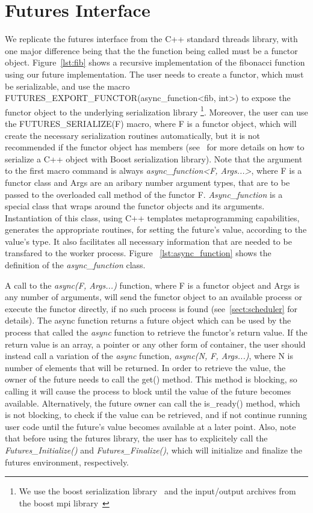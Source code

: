\section{Futures Interface}
\label{sect:futures-interface}
We replicate the futures interface from the C++ standard threads library, with one major difference being that 
the the function being called must be a functor object.  Figure~\ref{lst:fib} shows a recursive implementation
of the fibonacci function using our future implementation.  The user needs to create a functor, which must be
serializable, and use the macro 
FUTURES\_EXPORT\_FUNCTOR(async\_function<fib, int>) to expose the functor object to the underlying 
serialization library \footnote{We use the boost serialization library~\cite{Ramey:2004:Boost:Serialization} 
and the input/output archives from the boost mpi library~\cite{Gregor:2005:Boost:MPI}}.
Moreover, the user can use the FUTURES\_SERIALIZE(F) macro, where F is a functor object, 
which will create the necessary serialization routines automatically, but it is not recommended if the 
functor object has members (see~\cite{Ramey:2004:Boost:Serialization} for more details on how to serialize
a C++ object with Boost serialization library).
Note that the argument to the first macro command is always \emph{async\_function<F, Args...>},
where F is a functor class
and Args are an aribary number argument types, that are to be passed to the overloaded call method 
of the functor F.  \emph{Async\_function} is a special class that wraps around the functor objects and its
arguments.  Instantiation of this class, using C++ templates metaprogramming capabilities,
generates the appropriate routines, for setting the future's value, according to the value's type.
It also facilitates all necessary information that are needed to be transfared to the worker process.
Figure ~\ref{lst:async_function} shows the definition of the \emph{async\_function} class.


A call to the \emph{async(F, Args...)} function, where F is a functor object and Args 
is any number of arguments,
will send the functor object to an available process or execute 
the functor directly, if no such process is found (see~\ref{sect:scheduler} for details). 
The async function returns a 
future object which can be used by the process that called the \emph{async} function to retrieve the 
functor's return value.  If the return value is an array, a pointer or any other form of container, the user
should instead call a variation of the \emph{async} function, \emph{async(N, F, Args...)}, 
where N is number of elements that will be returned. In order to retrieve the value,
the owner of the future needs to call the get() method.  This method is blocking, so calling it will cause the 
process to block until the value of the future becomes available.  Alternatively, the future owner can call the
is\_ready() method, which is not blocking, to check if the value can be retrieved, and if not continue running
user code until the future's value becomes available at a later point.  Also, note that before using
the futures library, the user has to explicitely call the \emph{Futures\_Initialize()} and \emph{Futures\_Finalize()},
which will initialize and finalize the futures environment, respectively. 

